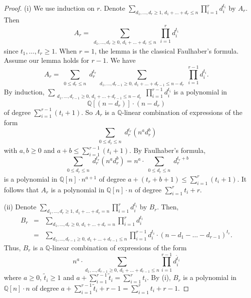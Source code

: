\documentclass[12pt, reqno]{amsart}
\theoremstyle{definition}
\theoremstyle{remark}
\numberwithin{equation}{section}
\newcommand{\Q}{ \mathbb Q }
\newcommand{\w}{\tilde}
\numberwithin{equation}{section}
\begin{document}
\begin{proof}
(i) We use induction on $r$. Denote 
$\displaystyle{\sum_{d_1, \ldots, d_r \ge 1, \, d_1+ \ldots + d_r \le n}
\prod_{i=1}^{r} d_i^{t_i}}$ by $A_r$. Then
$$
A_r = \sum_{\substack{d_1, \ldots, d_r \ge 0, \, d_1+ \ldots + d_r \le n}}
  \prod_{i=1}^{r} d_i^{t_i}
$$
since $t_1, \ldots, t_{r} \ge 1$. When $r = 1$, the lemma is 
the classical Faulhaber's formula. Assume our lemma holds for $r-1$. 
We have
$$
A_r = \sum_{\substack{0 \le d_r \le n}} d_r^{t_r} 
  \sum_{\substack{d_1, \ldots, d_{r-1} \ge 0, \, d_1+ \ldots + d_{r-1} 
  \le n-d_r}} \prod_{i=1}^{r-1} d_i^{t_i}.
$$
By induction, $\sum_{\substack{d_1, \ldots, d_{r-1} \ge 0, 
\, d_1+ \ldots + d_{r-1} \le n-d_r}} \prod_{i=1}^{r-1} d_i^{t_i}$ 
is a polynomial in 
$$
\Q[(n-d_r)] \cdot (n-d_r)
$$ 
of degree $\sum_{i=1}^{r-1} (t_i+1)$. 
So $A_r$ is a $\Q$-linear combination of expressions of the form
$$
\sum_{\substack{0 \le d_r \le n}} d_r^{t_r} (n^a d_r^b)
$$
with $a, b \ge 0$ and $a+b \le \sum_{i=1}^{r-1} (t_i+1)$. 
By Faulhaber's formula,
$$
  \sum_{\substack{0 \le d_r \le n}} d_r^{t_r} (n^a d_r^b)
= n^a \cdot \sum_{\substack{0 \le d_r \le n}} d_r^{t_r+b}
$$
is a polynomial in $\Q[n] \cdot n^{a+1}$ of degree $a + (t_r+b+1) \le 
\sum_{i=1}^{r} (t_i+1)$. It follows that $A_r$ is a polynomial in 
$\Q[n] \cdot n$ of degree $\sum_{i=1}^{r} t_i+r$.

(ii) Denote $\displaystyle{\sum_{d_1, \ldots, d_r \ge 1, 
\, d_1+ \ldots + d_r = n} \prod_{i=1}^{r} d_i^{t_i}}$ by $B_r$.
Then, 
\begin{eqnarray*}    
   B_r 
&=&\sum_{d_1, \ldots, d_r \ge 0, \, d_1+ \ldots + d_r = n}
   \prod_{i=1}^{r} d_i^{t_i}   \\
&=&\sum_{d_1, \ldots, d_{r-1} \ge 0, \, d_1+ \ldots + d_{r-1} \le n}
\prod_{i=1}^{r-1} d_i^{t_i} \cdot (n - d_1 - \ldots - d_{r-1})^{t_r}.
\end{eqnarray*}
Thus, $B_r$ is a $\Q$-linear combination of expressions of the form
$$
n^a \cdot \sum_{d_1, \ldots, d_{r-1} \ge 0, \, d_1+ \ldots + d_{r-1} \le n}
\prod_{i=1}^{r-1} d_i^{\w t_i}
$$
where $a \ge 0$, $\w t_i \ge 1$ and $a + \sum_{i=1}^{r-1} \w t_i 
= \sum_{i=1}^{r} t_i$. By (i), $B_r$ is a polynomial in 
$\Q[n] \cdot n$ of degree $a + \sum_{i=1}^{r-1} \w t_i + r - 1
= \sum_{i=1}^{r} t_i+r-1$.
\end{proof}
\end{document}
